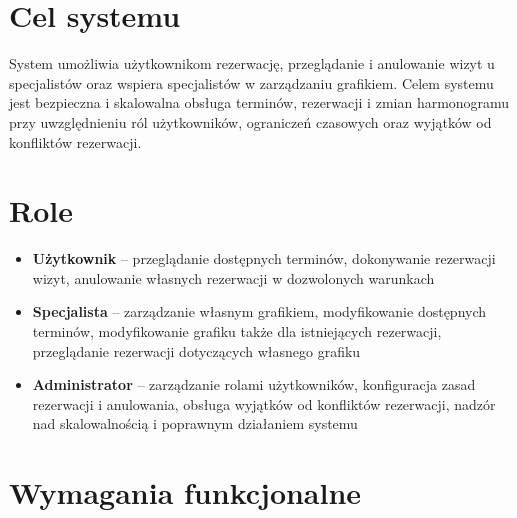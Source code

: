 \documentclass[12pt,a4paper]{article}
\begin{document}
\section{Cel systemu}

System umożliwia użytkownikom rezerwację, przeglądanie i anulowanie wizyt u specjalistów oraz wspiera specjalistów w zarządzaniu grafikiem. Celem systemu jest bezpieczna i skalowalna obsługa terminów, rezerwacji i zmian harmonogramu przy uwzględnieniu ról użytkowników, ograniczeń czasowych oraz wyjątków od konfliktów rezerwacji.

\section{Role}

\begin{itemize}[leftmargin=1.5em]
  \item \textbf{Użytkownik} -- przeglądanie dostępnych terminów, dokonywanie rezerwacji wizyt, anulowanie własnych rezerwacji w dozwolonych warunkach
  \item \textbf{Specjalista} -- zarządzanie własnym grafikiem, modyfikowanie dostępnych terminów, modyfikowanie grafiku także dla istniejących rezerwacji, przeglądanie rezerwacji dotyczących własnego grafiku
  \item \textbf{Administrator} -- zarządzanie rolami użytkowników, konfiguracja zasad rezerwacji i anulowania, obsługa wyjątków od konfliktów rezerwacji, nadzór nad skalowalnością i poprawnym działaniem systemu
\end{itemize}

\section{Wymagania funkcjonalne}
\end{document}
